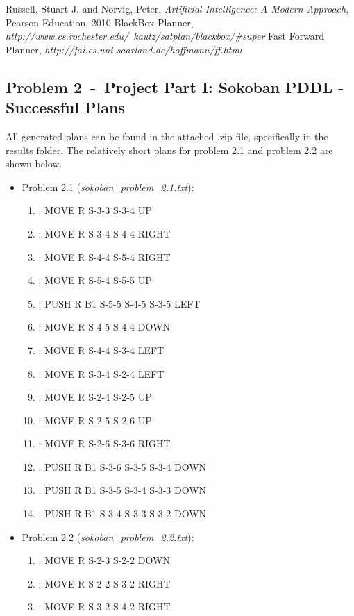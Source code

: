 \documentclass[12pt]{article}
\newcommand{\problem}[2]{\section*{Problem {#1}~-~{#2}}}
\begin{document}
\begin{thebibliography}{50}
   Russell, Stuart J. and Norvig, Peter, \textsl{Artificial Intelligence: A Modern Approach}, Pearson Education, 2010
   BlackBox Planner, \textsl{http://www.cs.rochester.edu/~kautz/satplan/blackbox/\#super}
   Fast Forward Planner, \textsl{http://fai.cs.uni-saarland.de/hoffmann/ff.html}
\end{thebibliography}

\newpage
\begin{appendix}
\problem{2}{Project Part I: Sokoban PDDL - Successful Plans}
  All generated plans can be found in the attached .zip file, specifically in the results folder. The relatively short plans for problem 2.1 and problem 2.2 are shown below. 
  \begin{itemize}
    \item Problem 2.1 (\textit{sokoban\_problem\_2.1.txt}):
      \begin{enumerate}
	\item: MOVE R S-3-3 S-3-4 UP
	\item: MOVE R S-3-4 S-4-4 RIGHT
	\item: MOVE R S-4-4 S-5-4 RIGHT
	\item: MOVE R S-5-4 S-5-5 UP
	\item: PUSH R B1 S-5-5 S-4-5 S-3-5 LEFT
	\item: MOVE R S-4-5 S-4-4 DOWN
	\item: MOVE R S-4-4 S-3-4 LEFT
	\item: MOVE R S-3-4 S-2-4 LEFT
	\item: MOVE R S-2-4 S-2-5 UP
	\item: MOVE R S-2-5 S-2-6 UP
	\item : MOVE R S-2-6 S-3-6 RIGHT
	\item: PUSH R B1 S-3-6 S-3-5 S-3-4 DOWN
	\item: PUSH R B1 S-3-5 S-3-4 S-3-3 DOWN
	\item: PUSH R B1 S-3-4 S-3-3 S-3-2 DOWN
      \end{enumerate}
    \item Problem 2.2 (\textit{sokoban\_problem\_2.2.txt}):
      \begin{enumerate}
	\item: MOVE R S-2-3 S-2-2 DOWN
	\item: MOVE R S-2-2 S-3-2 RIGHT
	\item: MOVE R S-3-2 S-4-2 RIGHT

\end{enumerate}
\end{itemize}
\end{appendix}
\end{document}
